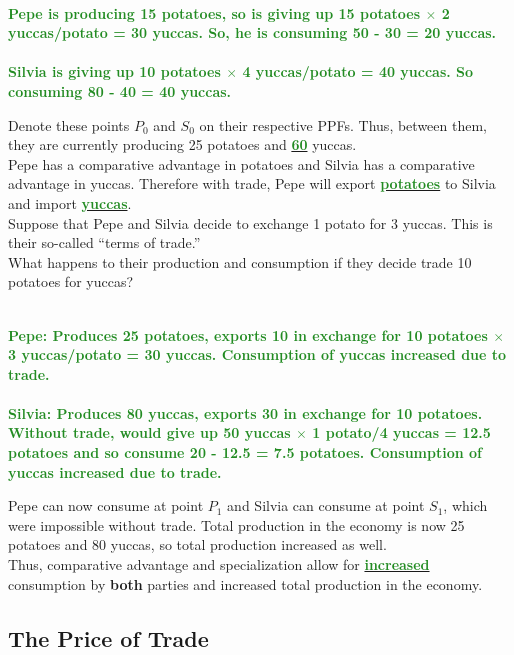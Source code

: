 \documentclass[11pt]{article}\usepackage[]{graphicx}\usepackage[]{color}
\theoremstyle{definition}
\newcommand{\blank}[1]{}
\newcommand{\ddp}[1]{{\textbf{\textcolor{ForestGreen}{#1}}}}
\newcommand{\dd}[1]{{\underline{\textbf{\textcolor{ForestGreen}{#1}}}}}
\begin{document}
	\ddp{\\ Pepe is producing 15 potatoes, so is giving up 15 potatoes $\times$ 2 yuccas/potato = 30 yuccas. So, he is consuming 50 - 30 = 20 yuccas. \\ \\
		Silvia is giving up 10 potatoes $\times$ 4 yuccas/potato = 40 yuccas. So consuming 80 - 40 = 40 yuccas. \\}
	\blank{} \blank{}
	
	Denote these points $P_0$ and $S_0$ on their respective PPFs. Thus, between them, they are currently producing 25 potatoes and \dd{60} yuccas.
	\\
	
	Pepe has a comparative advantage in potatoes and Silvia has a comparative advantage in yuccas. Therefore with trade, Pepe will export \dd{potatoes} to Silvia and import \dd{yuccas}. 
	\\
	
	Suppose that Pepe and Silvia decide to exchange 1 potato for 3 yuccas. This is their so-called ``terms of trade.''
	\\
	
	What happens to their production and consumption if they decide trade 10 potatoes for yuccas?
	
	\ddp{\\ Pepe: Produces 25 potatoes, exports 10 in exchange for 10 potatoes $\times$ 3 yuccas/potato = 30 yuccas. Consumption of yuccas increased due to trade. \\ \\
		Silvia: Produces 80 yuccas, exports 30 in exchange for 10 potatoes. \\ 
		Without trade, would give up 50 yuccas $\times$ 1 potato/4 yuccas = 12.5 potatoes and so consume 20 - 12.5 = 7.5 potatoes. Consumption of yuccas increased due to trade.\\}
	\blank{} \blank{}
	
	Pepe can now consume at point $P_1$ and Silvia can consume at point $S_1$, which were impossible without trade. Total production in the economy is now 25 potatoes and 80 yuccas, so total production increased as well.
	\\
	
	Thus, comparative advantage and specialization allow for \dd{increased} consumption by \textbf{both} parties and increased total production in the economy. 
	
	\subsection{The Price of Trade}
	
\end{document}
